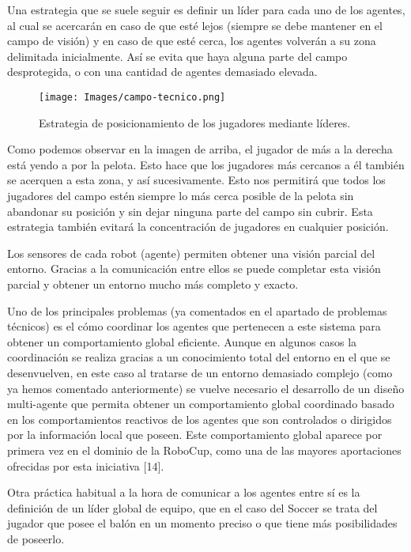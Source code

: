 \documentclass[11pt,oneside,a4paper]{book}
\begin{document}
Una estrategia que se suele seguir es definir un líder para cada uno de los agentes, al cual se acercarán en caso de que esté lejos (siempre se debe mantener en el campo de visión) y en caso de que esté cerca, los agentes volverán a su zona delimitada inicialmente. Así se evita que haya alguna parte del campo desprotegida, o con una cantidad de agentes demasiado elevada.
\begin{figure}[H]
\begin{center}
\texttt{[image: Images/campo-tecnico.png]}
\end{center}
\caption{Estrategia de posicionamiento de los jugadores mediante líderes.}
\end{figure}

Como podemos observar en la imagen de arriba, el jugador de más a la derecha está yendo a por la pelota. Esto hace que los jugadores más cercanos a él también se acerquen a esta zona, y así sucesivamente. Esto nos permitirá que todos los jugadores del campo estén siempre lo más cerca posible de la pelota sin abandonar su posición y sin dejar ninguna parte del campo sin cubrir. Esta estrategia también evitará la concentración de jugadores en cualquier posición.

Los sensores de cada robot (agente) permiten obtener una visión parcial del entorno. Gracias a la comunicación entre ellos se puede completar esta visión parcial y obtener un entorno mucho más completo y exacto.

Uno de los principales problemas (ya comentados en el apartado de problemas técnicos) es el cómo coordinar los agentes que pertenecen a este sistema para obtener un comportamiento global eficiente. Aunque en algunos casos la coordinación se realiza gracias a un conocimiento total del entorno en el que se desenvuelven, en este caso al tratarse de un entorno demasiado complejo (como ya hemos comentado anteriormente) se vuelve necesario el desarrollo de un diseño multi-agente que permita obtener un comportamiento global coordinado basado en los comportamientos reactivos de los agentes que son controlados o dirigidos por la información local que poseen.
Este comportamiento global aparece por primera vez en el dominio de la RoboCup, como una de las mayores aportaciones ofrecidas por esta iniciativa [14].

Otra práctica habitual a la hora de comunicar a los agentes entre sí es la definición de un líder global de equipo, que en el caso del Soccer se trata del jugador que posee el balón en un momento preciso o que tiene más posibilidades de poseerlo.
\end{document}
